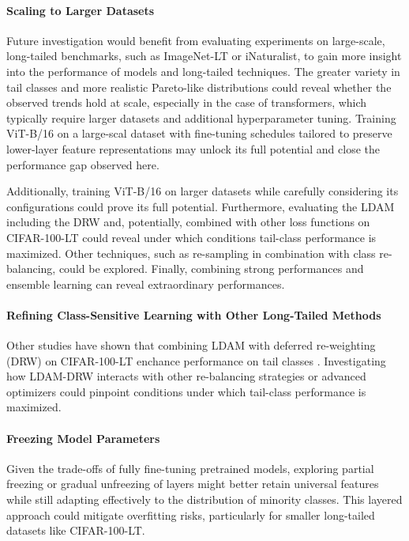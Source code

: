 \paragraph{Scaling to Larger Datasets}
Future investigation would benefit from evaluating experiments on large-scale, long-tailed benchmarks, such as ImageNet-LT or iNaturalist, to gain more insight into the performance of models and long-tailed techniques. The greater variety in tail classes and more realistic Pareto-like distributions could reveal whether the observed trends hold at scale, especially in the case of transformers, which typically require larger datasets and additional hyperparameter tuning. Training ViT-B/16 on a large-scal dataset with fine-tuning schedules tailored to preserve lower-layer feature representations may unlock its full potential and close the performance gap observed here.

Additionally, training ViT-B/16 on larger datasets while carefully considering its configurations could prove its full potential. Furthermore, evaluating the LDAM including the DRW and, potentially, combined with other loss functions on CIFAR-100-LT could reveal under which conditions tail-class performance is maximized. Other techniques, such as re-sampling in combination with class re-balancing, could be explored. Finally, combining strong performances and ensemble learning can reveal extraordinary performances.

\paragraph{Refining Class-Sensitive Learning with Other Long-Tailed Methods}
Other studies have shown that combining LDAM with deferred re-weighting (DRW) on CIFAR-100-LT enchance performance on tail classes \cite{cao2019learningimbalanceddatasetslabeldistributionaware,menon2021longtaillearninglogitadjustment}. Investigating how LDAM-DRW interacts with other re-balancing strategies or advanced optimizers could pinpoint conditions under which tail-class performance is maximized.

\paragraph{Freezing Model Parameters}
Given the trade-offs of fully fine-tuning pretrained models, exploring partial freezing or gradual unfreezing of layers might better retain universal features while still adapting effectively to the distribution of minority classes. This layered approach could mitigate overfitting risks, particularly for smaller long-tailed datasets like CIFAR-100-LT.


